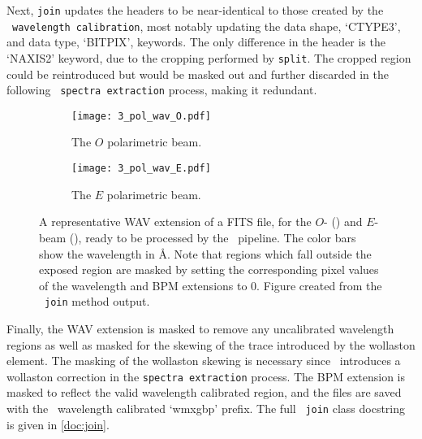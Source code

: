 Next, \texttt{join} updates the headers to be near-identical to those created by the \polsalt\ \texttt{wavelength calibration}, most notably updating the data shape, `CTYPE3', and data type, `BITPIX', keywords.
The only difference in the header is the  `NAXIS2' keyword, due to the cropping performed by \texttt{split}. The cropped region could be reintroduced but would be masked out and further discarded in the following \polsalt\ \texttt{spectra extraction} process, making it redundant.

\begin{figure}[t]
    \centering
    \begin{subfigure}[b]{1.0 \textwidth}
        \centering
        \texttt{[image: 3\_pol\_wav\_O.pdf]}
        \caption{The $O$ polarimetric beam.}
        \label{subfig:pol_O}
    \end{subfigure}
    \centering
    \begin{subfigure}[b]{1.0\textwidth}
        \centering
        \texttt{[image: 3\_pol\_wav\_E.pdf]}
        \caption{The $E$ polarimetric beam.}
        \label{subfig:pol_E}
    \end{subfigure}
    \caption{A representative \gls{WAV} extension of a \gls{FITS} file, for the $O$- () and $E$-beam (), ready to be processed by the \polsalt\ pipeline. The color bars show the wavelength in \AA. Note that regions which fall outside the exposed region are masked by setting the corresponding pixel values of the wavelength and \gls{BPM} extensions to $0$. Figure created from the \stops\ \texttt{join} method output.}
    \label{fig:pol_wav_ext}
\end{figure}

Finally, the \gls{WAV} extension is masked to remove any uncalibrated wavelength regions as well as masked for the skewing of the trace introduced by the wollaston element. The masking of the wollaston skewing is necessary since \polsalt\ introduces a wollaston correction in the \texttt{spectra extraction} process. The \gls{BPM} extension is masked to reflect the valid wavelength calibrated region, and the files are saved with the \polsalt\ wavelength calibrated `wmxgbp' prefix.
The full \stops\ \texttt{join} class docstring is given in \autoref{doc:join}.

